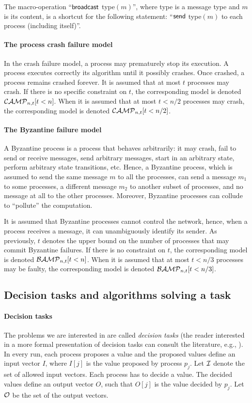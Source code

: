 \documentclass[11pt,letterpaper]{article}
\newcommand{\CM}{{\cal CAMP}_{n,t}}
\newcommand{\BM}{{\cal BAMP}_{n,t}}
\begin{document}
The macro-operation ``${\sf broadcast}$ {\sc type}$(m)$'', where {\sc type} is
a message type and $m$ is its content,  is a shortcut for the following
statement: ``${\sf send}$ {\sc type}$(m)$ to each process (including itself)''.




\paragraph{The process crash failure model}
In the crash failure model, a process may prematurely stop its execution.
A process executes correctly its algorithm until it possibly crashes.
Once crashed, a process remains crashed forever.
It is assumed that at most $t$ processes may crash.
If there is no specific constraint on $t$, the corresponding model
is denoted  $\CM[t<n]$.
When  it is assumed that at most $t<n/2$ processes
may crash,  the corresponding model is denoted $\CM[t<n/2]$.


\paragraph{The Byzantine failure model}
A  Byzantine process is a process that behaves
arbitrarily: it may crash, fail to send or receive messages, send
arbitrary messages, start in an arbitrary state, perform arbitrary state
transitions, etc. Hence, a Byzantine process, which is assumed to send the
same message $m$ to all the processes, can send a message $m_1$ to some
processes, a different message $m_2$  to another subset of processes, and no
message at all to the other processes. Moreover, Byzantine processes can
 collude to ``pollute'' the computation.

It is assumed that Byzantine processes cannot control the network, hence,
when  a process receives a  message, it can unambiguously identify its sender.
As previously, $t$ denotes the upper bound on the number of processes that
may commit Byzantine failures.
If there is no constraint on $t$, the corresponding model
is denoted  $\BM[t<n]$.
When  it is assumed that at most $t<n/3$ processes may be faulty,
the corresponding model is denoted $\BM[t<n/3]$.


\subsection{Decision tasks and algorithms solving a task}

\paragraph{Decision tasks}
The problems we are interested in are called {\it decision tasks}
(the reader interested in a more formal presentation of  decision tasks can
consult the literature, e.g., \cite{BGLR01,HS99}).
In every run, each process proposes a value and the proposed values define
an input vector $I$, where $I[j]$ is the value proposed by process $p_j$.
Let ${\cal I}$ denote the set of  allowed input vectors.
Each process has to decide a value. The decided values define an
output  vector $O$,  such that  $O[j]$ is  the value  decided by  $p_j$.
Let ${\cal O}$ be the  set of  the output vectors.
\end{document}
